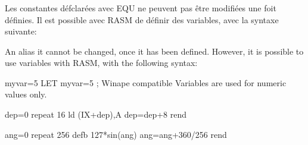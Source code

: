 \subsubsection{}
\begin{xfr}
Les constantes défclarées avec EQU ne peuvent pas être modifiées une foit définies.
Il est possible avec RASM de définir des variables, avec la syntaxe suivante:
\end{xfr}

\begin{xen}
An alias it cannot be changed, once it has been defined. 
However, it is possible to use variables with RASM, with the following syntax:
\end{xen}

\begin{code}
myvar=5
LET myvar=5 		; Winape compatible Variables are used for numeric values only.
\end{code}


\begin{code}
  dep=0
  repeat 16
    ld (IX+dep),A
    dep=dep+8
  rend
\end{code}

\begin{code}
  ang=0
  repeat 256
    defb 127*sin(ang)
    ang=ang+360/256
  rend
\end{code}

\subsection{}

